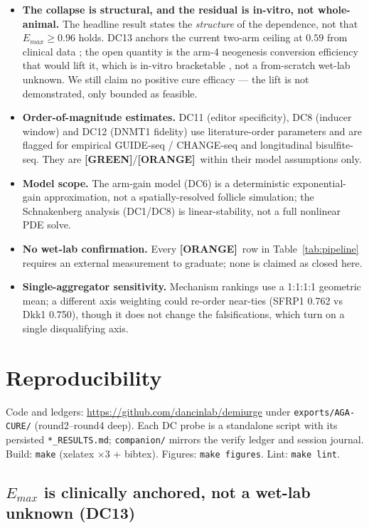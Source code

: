 \documentclass[11pt,a4paper]{article}
\newcommand{\tierbadge}[2]{\textcolor{#1}{\textbf{[#2]}}}
\providecommand{\tierGreen}{\tierbadge{green!45!black}{GREEN}}
\providecommand{\tierOrange}{\tierbadge{orange!80!black}{ORANGE}}
\begin{document}
\begin{itemize}\itemsep0.25em
\item \textbf{The collapse is structural, and the residual is in-vitro, not
whole-animal.} The headline result states the \emph{structure} of the dependence,
not that $E_{max}\geq 0.96$ holds. DC13 anchors the current two-arm ceiling at
$0.59$ from clinical data \citep{vanneste2020}; the open quantity is the arm-4
neogenesis conversion efficiency that would lift it, which is in-vitro bracketable
\citep{vitroDrugTest2023}, not a from-scratch wet-lab unknown. We still claim no
positive cure efficacy --- the lift is not demonstrated, only bounded as feasible.
\item \textbf{Order-of-magnitude estimates.} DC11 (editor specificity), DC8
(inducer window) and DC12 (DNMT1 fidelity) use literature-order parameters and are
flagged for empirical GUIDE-seq / CHANGE-seq and longitudinal bisulfite-seq. They
are \tierGreen/\tierOrange\ within their model assumptions only.
\item \textbf{Model scope.} The arm-gain model (DC6) is a deterministic
exponential-gain approximation, not a spatially-resolved follicle simulation; the
Schnakenberg analysis (DC1/DC8) is linear-stability, not a full nonlinear PDE solve.
\item \textbf{No wet-lab confirmation.} Every \tierOrange\ row in
Table~\ref{tab:pipeline} requires an external measurement to graduate; none is
claimed as closed here.
\item \textbf{Single-aggregator sensitivity.} Mechanism rankings use a 1:1:1:1
geometric mean; a different axis weighting could re-order near-ties
(SFRP1 0.762 vs Dkk1 0.750), though it does not change the falsifications, which
turn on a single disqualifying axis.
\end{itemize}

\section{Reproducibility}
\label{sec:repro}

Code and ledgers: \url{https://github.com/dancinlab/demiurge} under
\texttt{exports/AGA-CURE/} (round2--round4 deep). Each DC probe is a standalone
script with its persisted \texttt{*\_RESULTS.md}; \texttt{companion/} mirrors the
verify ledger and session journal. Build: \texttt{make} (xelatex $\times 3$ +
bibtex). Figures: \texttt{make figures}. Lint: \texttt{make lint}.

\subsection{$E_{max}$ is clinically anchored, not a wet-lab unknown (DC13)}
\label{sec:emax-anchor}
\end{document}
